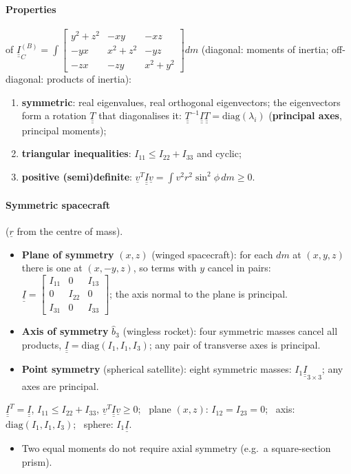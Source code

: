 \paragraph{Properties} of $\underline{\underline I}_C^{(B)}=\int\begin{bmatrix}y^2+z^2&-xy&-xz\\-yx&x^2+z^2&-yz\\-zx&-zy&x^2+y^2\end{bmatrix}dm$
(diagonal: moments of inertia; off-diagonal: products of inertia):
\begin{enumerate}
\item \textbf{symmetric}: real eigenvalues, real orthogonal eigenvectors; the eigenvectors form a rotation $\underline{\underline T}$ that diagonalises it:
$\underline{\underline T}^{-1}\underline{\underline I}\underline{\underline T}=\mathrm{diag}(\lambda_i)$ (\textbf{principal axes}, principal moments);
\item \textbf{triangular inequalities}: $I_{11}\le I_{22}+I_{33}$ and cyclic;
\item \textbf{positive (semi)definite}: $\underline v^T\underline{\underline I}\underline v=\int v^2r^2\sin^2\phi\,dm\ge0$.
\end{enumerate}
\paragraph{Symmetric spacecraft} ($\underline r$ from the centre of mass).
\begin{itemize}
\item \textbf{Plane of symmetry} $(x,z)$ (winged spacecraft): for each $dm$ at $(x,y,z)$ there is one at $(x,-y,z)$, so terms with $y$ cancel in pairs:
$\underline{\underline I}=\begin{bmatrix}I_{11}&0&I_{13}\\0&I_{22}&0\\I_{31}&0&I_{33}\end{bmatrix}$; the axis normal to the plane is principal.
\item \textbf{Axis of symmetry} $\hat b_3$ (wingless rocket): four symmetric masses cancel all products, $\underline{\underline I}=\mathrm{diag}(I_1,I_1,I_3)$;
any pair of transverse axes is principal.
\item \textbf{Point symmetry} (spherical satellite): eight symmetric masses: $I_1\underline{\underline I}_{3\times3}$; any axes are principal.
\end{itemize}
\begin{keyf}
$\underline{\underline I}^T=\underline{\underline I}$, $I_{11}\le I_{22}+I_{33}$, $\underline v^T\underline{\underline I}\underline v\ge0$; \ plane $(x,z)$: $I_{12}=I_{23}=0$; \ axis: $\mathrm{diag}(I_1,I_1,I_3)$; \ sphere: $I_1\underline{\underline I}$.
\end{keyf}
\pitfalls
\begin{itemize}
\item Two equal moments do not require axial symmetry (e.g.\ a square-section prism).
\end{itemize}

